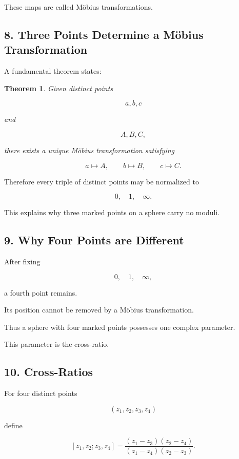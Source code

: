 \documentclass[12pt,a4paper]{article}
\newtheorem{theorem}{Theorem}[section]
\theoremstyle{notespace}
\begin{document}
These maps are called Möbius transformations.

\bigskip

\subsection{8. Three Points Determine a Möbius Transformation}

A fundamental theorem states:

\begin{theorem}
	Given distinct points
	
	\[
	a,b,c
	\]
	
	and
	
	\[
	A,B,C,
	\]
	
	there exists a unique Möbius transformation satisfying
	
	\[
	a\mapsto A,
	\qquad
	b\mapsto B,
	\qquad
	c\mapsto C.
	\]
\end{theorem}

Therefore every triple of distinct points may be normalized to

\[
0,\quad1,\quad\infty.
\]

This explains why three marked points on a sphere carry no moduli.

\bigskip

\subsection{9. Why Four Points are Different}

After fixing

\[
0,\quad1,\quad\infty,
\]

a fourth point remains.

Its position cannot be removed by a Möbius transformation.

Thus a sphere with four marked points possesses one complex parameter.

This parameter is the cross-ratio.

\bigskip

\subsection{10. Cross-Ratios}

For four distinct points

\[
(z_1,z_2,z_3,z_4)
\]

define

\[
[z_1,z_2;z_3,z_4]
=
\frac{(z_1-z_3)(z_2-z_4)}
{(z_1-z_4)(z_2-z_3)}.
\]
\end{document}
